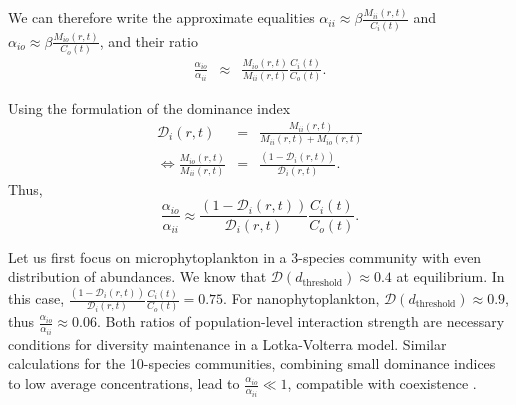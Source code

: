 \documentclass[english]{article}
\begin{document}
We can therefore write the approximate equalities $\alpha_{ii}\approx\beta\frac{M_{ii}(r,t)}{C_{i}(t)}$
and $\alpha_{io}\approx\beta\frac{M_{io}(r,t)}{C_{o}(t)}$, and their
ratio
\begin{equation}
\begin{array}{ccc}
\frac{\alpha_{io}}{\alpha_{ii}} & \approx & \frac{M_{io}(r,t)}{M_{ii}(r,t)}\frac{C_{i}(t)}{C_{o}(t)}.\end{array}
\end{equation}

Using the formulation of the dominance index
\begin{equation}
\begin{array}{ccc}
\mathcal{D}_{i}(r,t) & = & \frac{M_{ii}(r,t)}{M_{ii}(r,t)+M_{io}(r,t)}\\
\Leftrightarrow\frac{M_{io}(r,t)}{M_{ii}(r,t)} & = & \frac{\left(1-\mathcal{D}_{i}(r,t)\right)}{\mathcal{D}_{i}(r,t)}.
\end{array}\label{eq:dominance}
\end{equation}
Thus,
\begin{equation}
\frac{\alpha_{io}}{\alpha_{ii}}\approx\frac{\left(1-\mathcal{D}_{i}(r,t)\right)}{\mathcal{D}_{i}(r,t)}\frac{C_{i}(t)}{C_{o}(t)}.
\end{equation}

Let us first focus on microphytoplankton in a 3-species community
with even distribution of abundances. We know that $\mathcal{D}(d_{\text{threshold}})\approx0.4$
at equilibrium. In this case, $\frac{\left(1-\mathcal{D}_{i}(r,t)\right)}{\mathcal{D}_{i}(r,t)}\frac{C_{i}(t)}{C_{o}(t)}=0.75$.
For nanophytoplankton, $\mathcal{D}(d_{\text{threshold}})\approx0.9$,
thus $\frac{\alpha_{io}}{\alpha_{ii}}\approx0.06$. Both ratios of
population-level interaction strength are necessary conditions for
diversity maintenance in a Lotka-Volterra model. Similar calculations
for the 10-species communities, combining small dominance indices
to low average concentrations, lead to $\frac{\alpha_{io}}{\alpha_{ii}}\ll1$,
compatible with coexistence \citep{barabas_effect_2016}. 



\end{document}
